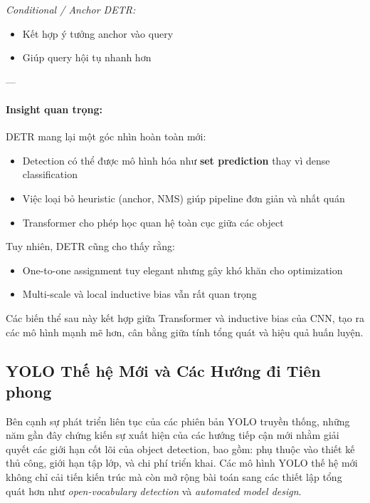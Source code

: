 \textit{Conditional / Anchor DETR:}
\begin{itemize}
	\item Kết hợp ý tưởng anchor vào query
	\item Giúp query hội tụ nhanh hơn
\end{itemize}

---

\paragraph{Insight quan trọng:}

DETR mang lại một góc nhìn hoàn toàn mới:

\begin{itemize}
	\item Detection có thể được mô hình hóa như \textbf{set prediction} thay vì dense classification
	\item Việc loại bỏ heuristic (anchor, NMS) giúp pipeline đơn giản và nhất quán
	\item Transformer cho phép học quan hệ toàn cục giữa các object
\end{itemize}

Tuy nhiên, DETR cũng cho thấy rằng:
\begin{itemize}
	\item One-to-one assignment tuy elegant nhưng gây khó khăn cho optimization
	\item Multi-scale và local inductive bias vẫn rất quan trọng
\end{itemize}

Các biến thể sau này kết hợp giữa Transformer và inductive bias của CNN, tạo ra các mô hình mạnh mẽ hơn, cân bằng giữa tính tổng quát và hiệu quả huấn luyện.

\subsection{YOLO Thế hệ Mới và Các Hướng đi Tiên phong}
\label{subsec:new_generation_yolo}

Bên cạnh sự phát triển liên tục của các phiên bản YOLO truyền thống, những năm gần đây chứng kiến sự xuất hiện của các hướng tiếp cận mới nhằm giải quyết các giới hạn cốt lõi của object detection, bao gồm: phụ thuộc vào thiết kế thủ công, giới hạn tập lớp, và chi phí triển khai. Các mô hình YOLO thế hệ mới không chỉ cải tiến kiến trúc mà còn mở rộng bài toán sang các thiết lập tổng quát hơn như \textit{open-vocabulary detection} và \textit{automated model design}.

